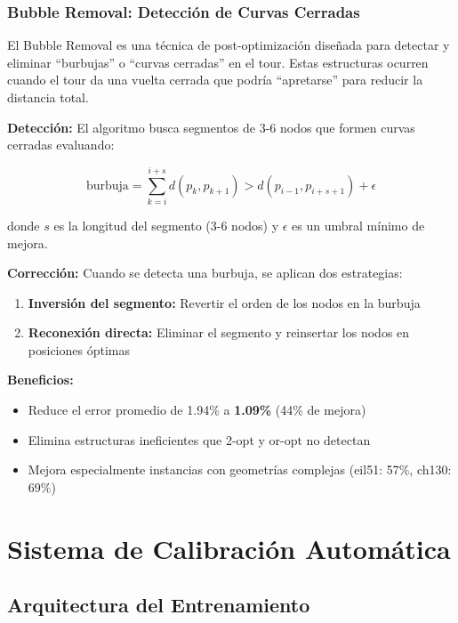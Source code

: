 \documentclass[12pt, a4paper]{article}
\begin{document}
\subsubsection{Bubble Removal: Detección de Curvas Cerradas}

El Bubble Removal es una técnica de post-optimización diseñada para detectar y eliminar ``burbujas'' o ``curvas cerradas'' en el tour. Estas estructuras ocurren cuando el tour da una vuelta cerrada que podría ``apretarse'' para reducir la distancia total.

\textbf{Detección:} El algoritmo busca segmentos de 3-6 nodos que formen curvas cerradas evaluando:

\begin{equation}
\text{burbuja} = \sum_{k=i}^{i+s} d(p_k, p_{k+1}) > d(p_{i-1}, p_{i+s+1}) + \epsilon
\end{equation}

donde $s$ es la longitud del segmento (3-6 nodos) y $\epsilon$ es un umbral mínimo de mejora.

\textbf{Corrección:} Cuando se detecta una burbuja, se aplican dos estrategias:

\begin{enumerate}
    \item \textbf{Inversión del segmento:} Revertir el orden de los nodos en la burbuja
    \item \textbf{Reconexión directa:} Eliminar el segmento y reinsertar los nodos en posiciones óptimas
\end{enumerate}

\textbf{Beneficios:}
\begin{itemize}
    \item Reduce el error promedio de 1.94\% a \textbf{1.09\%} (44\% de mejora)
    \item Elimina estructuras ineficientes que 2-opt y or-opt no detectan
    \item Mejora especialmente instancias con geometrías complejas (eil51: 57\%, ch130: 69\%)
\end{itemize}

\section{Sistema de Calibración Automática}

\subsection{Arquitectura del Entrenamiento}
\end{document}
